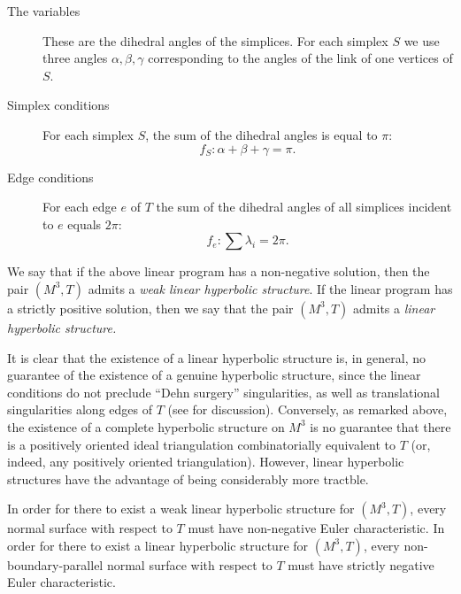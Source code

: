 \documentclass{acmart}
\newcommand{\thm}[2]{\begin{#1} #2 \end{#1}}
\begin{document}
\begin{description}
\item[The variables] These are the dihedral angles of the simplices. For
  each simplex $S$ we use three angles $\alpha, \beta, \gamma$
  corresponding to the angles of the link of one vertices of $S$.

\item[Simplex conditions]
For each simplex $S$, the sum of the dihedral angles is equal to $\pi$:
\begin{equation}
f_S: \alpha + \beta + \gamma = \pi.
\end{equation}

\item[Edge conditions]
For each edge $e$ of $T$ the sum of the dihedral angles of all
simplices incident to $e$ equals $2\pi:$
\begin{equation}
f_e: \sum \lambda_i = 2\pi.
\end{equation}
\end{description}

\thm{definition}
{
We say that if the above linear program has a non-negative solution,
then the pair $(M^3, T)$ admits a \emph{weak linear hyperbolic
  structure}. If the linear program has a strictly positive solution,
then we say that the pair $(M^3, T)$ admits a \emph{linear hyperbolic
  structure.}
}

It is clear that the existence of a linear hyperbolic structure is, in
general, no guarantee of the existence of a genuine hyperbolic
structure, since the linear conditions do not preclude ``Dehn
surgery'' singularities, as well as translational singularities along
edges of $T$ (see \cite{thgt3m,nz} for discussion). Conversely, as
remarked above, the existence of a 
complete hyperbolic structure on $M^3$ is no guarantee that there is a
positively oriented ideal triangulation combinatorially equivalent to
$T$ (or, indeed, any positively oriented triangulation). However,
linear hyperbolic structures have the advantage of being considerably
more tractble. 

\thm{theorem}
{
\label{hext}
In order for there to exist a weak linear hyperbolic structure for
$(M^3, T)$, every normal surface with respect to $T$ must have
non-negative Euler characteristic. In order for there to exist a
linear hyperbolic structure for $(M^3, T)$, every
non-boundary-parallel normal surface with respect to $T$ must have
strictly negative Euler characteristic.
}
\end{document}

